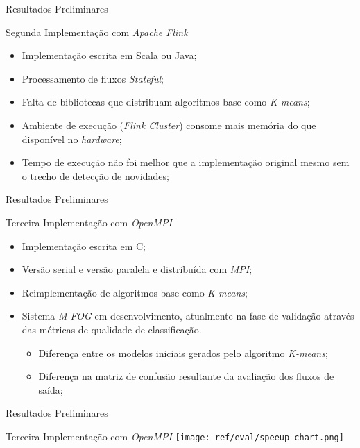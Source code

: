 \documentclass[aspectratio=43,10pt]{beamer}
\begin{document}
\begin{frame}[fragile]{Resultados Preliminares}
  \begin{alertblock}{Segunda Implementação com \emph{Apache Flink}}
    \begin{itemize}%
      \item Implementação escrita em Scala ou Java;
      \item Processamento de fluxos \emph{Stateful};
      \item Falta de bibliotecas que distribuam algoritmos base como \emph{K-means};
      \item Ambiente de execução (\emph{Flink Cluster}) consome mais memória do
      que disponível no \emph{hardware};
      \item Tempo de execução não foi melhor que a implementação original mesmo
      sem o trecho de detecção de novidades;
    \end{itemize}
  \end{alertblock}
\end{frame}

\begin{frame}[fragile]{Resultados Preliminares}
  \begin{alertblock}{Terceira Implementação com \emph{OpenMPI}}
    \begin{itemize}%
      \item Implementação escrita em C;
      \item Versão serial e versão paralela e distribuída com \emph{MPI};
      \item Reimplementação de algoritmos base como \emph{K-means};
      \item Sistema \emph{M-FOG} em desenvolvimento, atualmente na fase de
      validação através das métricas de qualidade de classificação.
      \begin{itemize}
        \item Diferença entre os modelos iniciais gerados pelo algoritmo \emph{K-means};
        \item Diferença na matriz de confusão resultante da avaliação dos fluxos de saída;
      \end{itemize}
    \end{itemize}
  \end{alertblock}
\end{frame}

\begin{frame}[fragile]{Resultados Preliminares}
  \begin{alertblock}{Terceira Implementação com \emph{OpenMPI}}
    \texttt{[image: ref/eval/speeup-chart.png]}
  \end{alertblock}
\end{frame}
\end{document}
